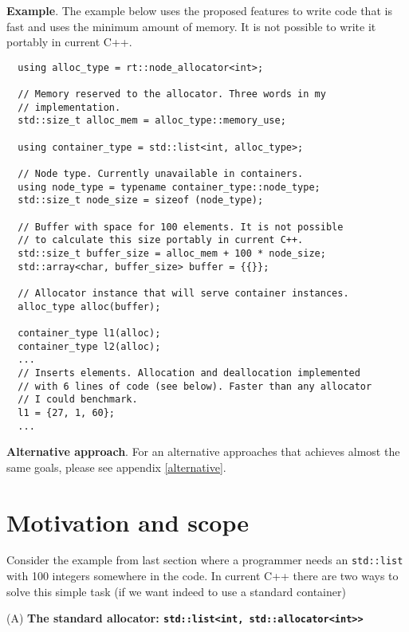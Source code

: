 \documentclass[11pt]{article}
\begin{document}
\medskip
\noindent
{\bf Example}. The example below uses the proposed features
to write code that is fast and uses the minimum amount of memory. It is not 
possible to write it portably in current C++.
\medskip
\begin{lstlisting}
  using alloc_type = rt::node_allocator<int>;

  // Memory reserved to the allocator. Three words in my
  // implementation.
  std::size_t alloc_mem = alloc_type::memory_use;

  using container_type = std::list<int, alloc_type>;

  // Node type. Currently unavailable in containers.
  using node_type = typename container_type::node_type;
  std::size_t node_size = sizeof (node_type);

  // Buffer with space for 100 elements. It is not possible
  // to calculate this size portably in current C++.
  std::size_t buffer_size = alloc_mem + 100 * node_size;
  std::array<char, buffer_size> buffer = {{}};

  // Allocator instance that will serve container instances.
  alloc_type alloc(buffer);

  container_type l1(alloc);
  container_type l2(alloc);
  ...
  // Inserts elements. Allocation and deallocation implemented
  // with 6 lines of code (see below). Faster than any allocator
  // I could benchmark.
  l1 = {27, 1, 60};
  ...
\end{lstlisting}

\medskip
\noindent
{\bf Alternative approach}. For an alternative approaches that achieves almost
the same goals, please see appendix \ref{alternative}.

\section{Motivation and scope}

Consider the example from last section where a programmer needs an
\texttt{std::list} with 100 integers somewhere in the code. In current C++
there are two ways to solve this simple task (if we want indeed to use a
standard container)

\medskip
\medskip
\noindent
{(A) \bf The standard allocator: \texttt{std::list<int, std::allocator<int>>}} \\
\end{document}
